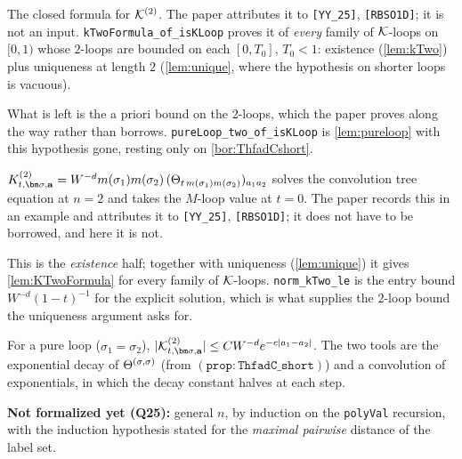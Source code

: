 \begin{theorem}[$\mathtt{(Kn2sol)}$, the $n=2$ loop --- \emph{now a theorem}]\label{lem:KTwoFormula}
  \leanok
  The closed formula for $\mathcal{K}^{(2)}$.  The paper attributes it to \texttt{[YY\_25]},
  \texttt{[RBSO1D]}; it is not an input.  \texttt{kTwoFormula\_of\_isKLoop} proves it of
  \emph{every} family of $\mathcal{K}$-loops on $[0,1)$ whose $2$-loops are bounded on each
  $[0,T_0]$, $T_0<1$: existence (\ref{lem:kTwo}) plus uniqueness at length $2$
  (\ref{lem:unique}, where the hypothesis on shorter loops is vacuous).

  What is left is the a priori bound on the $2$-loops, which the paper proves along the
  way rather than borrows.  \texttt{pureLoop\_two\_of\_isKLoop} is \ref{lem:pureloop} with
  this hypothesis gone, resting only on \ref{bor:ThfadCshort}.
\end{theorem}

\begin{lemma}\label{lem:kTwo}
  \leanok
  $K^{(2)}_{t,\bm\sigma,\mathbf a}=W^{-d}m(\sigma_1)m(\sigma_2)\,(\Th_{t\,m(\sigma_1)m(\sigma_2)})_{a_1a_2}$
  solves the convolution tree equation at $n=2$ and takes the $M$-loop value at $t=0$.
  The paper records this in an example and attributes it to \texttt{[YY\_25]},
  \texttt{[RBSO1D]}; it does not have to be borrowed, and here it is not.

  This is the \emph{existence} half; together with uniqueness (\ref{lem:unique}) it gives
  \ref{lem:KTwoFormula} for every family of $\mathcal{K}$-loops.  \texttt{norm\_kTwo\_le} is the
  entry bound $W^{-d}(1-t)^{-1}$ for the explicit solution, which is what supplies the
  $2$-loop bound the uniqueness argument asks for.
\end{lemma}

\begin{lemma}[$\mathtt{lem\_pureloop}$, $n=2$]\label{lem:pureloop}
  \leanok
  For a pure loop ($\sigma_1=\sigma_2$), $|\Kcal^{(2)}_{t,\bm\sigma,\mathbf a}|\le
  C W^{-d}e^{-c|a_1-a_2|}$.  The two tools are the exponential decay of $\Theta^{(\sigma,\sigma)}$
  (from $\mathtt{(prop{:}ThfadC\_short)}$) and a convolution of exponentials, in which the
  decay constant halves at each step.

  \textbf{Not formalized yet (Q25):} general $n$, by induction on the \texttt{polyVal}
  recursion, with the induction hypothesis stated for the \emph{maximal pairwise} distance
  of the label set.
\end{lemma}
